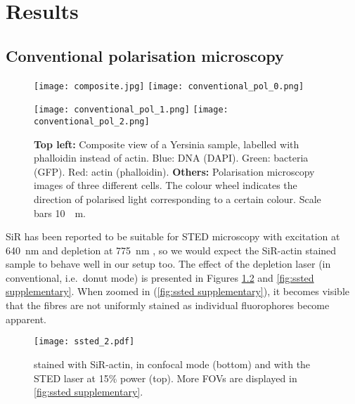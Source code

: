 \chapter{Results}

\section{Conventional polarisation microscopy}
\label{sec:conventional pol}
\begin{figure}
	\centering
	\newlength{\spacing}
	\setlength{\spacing}{7pt}
	
	\texttt{[image: composite.jpg]}%
	\hspace{\spacing}%
	\texttt{[image: conventional\_pol\_0.png]}
	
	\vspace{\spacing}
	
	\texttt{[image: conventional\_pol\_1.png]}%
	\hspace{\spacing}%
	\texttt{[image: conventional\_pol\_2.png]}
	
	\caption{
		\textbf{Top left:} Composite view of a Yersinia sample, labelled with phalloidin instead of actin. Blue: DNA (DAPI). Green: bacteria (GFP). Red: actin (phalloidin).
		\textbf{Others:} Polarisation microscopy images of three different cells. The colour wheel indicates the direction of polarised light corresponding to a certain colour. Scale bars \SI{10}{\mu m}.
	}
	\label{fig:composite}
\end{figure}

SiR has been reported to be suitable for STED microscopy with excitation at 640~nm and depletion at 775~nm \cite{DEste2015}, so we would expect the SiR-actin stained sample to behave well in our setup too. The effect of the depletion laser (in conventional, i.e.~donut mode) is presented in Figures \ref{fig:ssted} and \ref{fig:ssted supplementary}. When zoomed in (\autoref{fig:ssted supplementary}), it becomes visible that the fibres are not uniformly stained as individual fluorophores become apparent.

\begin{figure}
	\centering
	\texttt{[image: ssted\_2.pdf]}
	\caption{
	 stained with SiR-actin, in confocal mode (bottom) and with the STED laser at 15\% power (top). More FOVs are displayed in \autoref{fig:ssted supplementary}.
	}
	\label{fig:ssted}
\end{figure}

